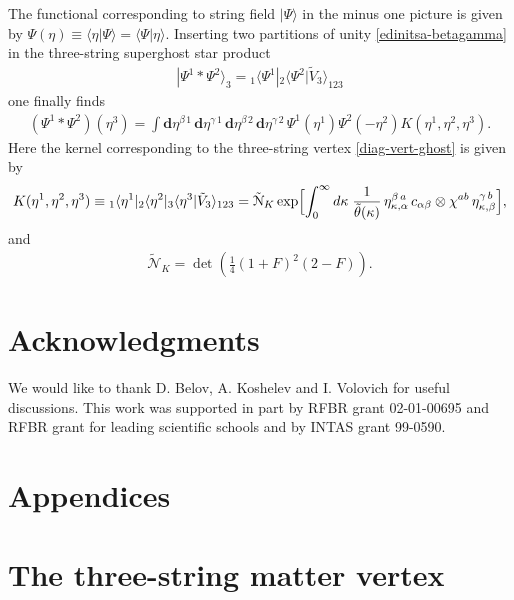 \documentclass[a4paper,12pt]{article}
\newcommand{\Nc}{\mathcal{N}}
\renewcommand{\theequation}{\arabic{section}.\arabic{equation}}
\begin{document}
The functional corresponding to string field $|\Psi\rangle$
in the minus one picture is given by
$\Psi(\eta)\equiv
\langle\eta|\Psi\rangle=\langle\Psi|\eta\rangle$.
Inserting two partitions of unity
\eqref{edinitsa-betagamma} in the three-string superghost star product
\begin{gather}
|\Psi^{1}*\Psi^{2}\rangle_{3}
={}_{1}\langle\Psi^1|{}_{2}\langle\Psi^{2}|\tilde{V}_{3}\rangle_{123}
\end{gather}
one finally finds
\begin{gather}
(\Psi^{1}*\Psi^{2})(\eta^{3})
=\int
\mathbf{d}\eta^{\beta\,1}\,\mathbf{d}\eta^{\gamma\,1}\,
\mathbf{d}\eta^{\beta\,2}\,\mathbf{d}\eta^{\gamma\,2}\,
\Psi^{1}(\eta^1)
\Psi^{2}(-\eta^2)
K(\eta^1,\eta^2,\eta^3).
\end{gather}
Here the kernel
corresponding to the three-string vertex \eqref{diag-vert-ghost}
is given by
\begin{gather}
K(\eta^1,\eta^2,\eta^3)\equiv
{}_{1}\langle \eta^1|
{}_{2}\langle \eta^2|
{}_{3}\langle \eta^3|\tilde{V}_{3}\rangle_{123}
=\tilde{\Nc}_{K}\exp\Bigl[\int_{0}^{\infty}d\kappa\;
\frac{1}{\tilde{\theta}(\kappa)}\,
\eta^{\beta\,a}_{\kappa,\alpha}
\,c_{\alpha\beta}\otimes \chi^{ab}\,
\eta^{\gamma\,b}_{\kappa,\beta}\Bigr],
\end{gather}
 and
\begin{gather}
\tilde{\Nc}_{K}=\det\left(
\tfrac14(1+F)^{2}(2-F)\right).
\end{gather}




\section*{Acknowledgments}
We would like to thank D. Belov, A. Koshelev and I. Volovich for
useful discussions. This work was supported in part by RFBR grant
02-01-00695  and RFBR grant for leading scientific schools and  by
INTAS grant 99-0590.


\appendix
\section*{Appendices}
\renewcommand {\theequation}{\thesection.\arabic{equation}}

\section{The three-string matter vertex}
\setcounter{equation}{0}
\end{document}
